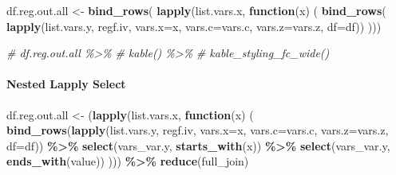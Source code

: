 \documentclass[
]{book}
\newenvironment{Shaded}{\begin{snugshade}}{\end{snugshade}}
\newcommand{\CommentTok}[1]{\textcolor[rgb]{0.56,0.35,0.01}{\textit{#1}}}
\newcommand{\ControlFlowTok}[1]{\textcolor[rgb]{0.13,0.29,0.53}{\textbf{#1}}}
\newcommand{\DataTypeTok}[1]{\textcolor[rgb]{0.13,0.29,0.53}{#1}}
\newcommand{\KeywordTok}[1]{\textcolor[rgb]{0.13,0.29,0.53}{\textbf{#1}}}
\newcommand{\NormalTok}[1]{#1}
\newcommand{\OperatorTok}[1]{\textcolor[rgb]{0.81,0.36,0.00}{\textbf{#1}}}
\newcommand{\StringTok}[1]{\textcolor[rgb]{0.31,0.60,0.02}{#1}}
\begin{document}
\begin{Shaded}
\begin{Highlighting}[]
\NormalTok{df.reg.out.all \textless{}{-}}\StringTok{ }\KeywordTok{bind\_rows}\NormalTok{(}
  \KeywordTok{lapply}\NormalTok{(list.vars.x,}
         \ControlFlowTok{function}\NormalTok{(x) (}
           \KeywordTok{bind\_rows}\NormalTok{(}
             \KeywordTok{lapply}\NormalTok{(list.vars.y, regf.iv,}
                    \DataTypeTok{vars.x=}\NormalTok{x, }\DataTypeTok{vars.c=}\NormalTok{vars.c, }\DataTypeTok{vars.z=}\NormalTok{vars.z, }\DataTypeTok{df=}\NormalTok{df))}
\NormalTok{         )))}
\end{Highlighting}
\end{Shaded}

\begin{Shaded}
\begin{Highlighting}[]
\CommentTok{\# df.reg.out.all \%\textgreater{}\%}
\CommentTok{\#   kable() \%\textgreater{}\%}
\CommentTok{\#   kable\_styling\_fc\_wide()}
\end{Highlighting}
\end{Shaded}

\hypertarget{nested-lapply-select}{%
\paragraph{Nested Lapply Select}\label{nested-lapply-select}}

\begin{Shaded}
\begin{Highlighting}[]
\NormalTok{df.reg.out.all \textless{}{-}}
\StringTok{  }\NormalTok{(}\KeywordTok{lapply}\NormalTok{(list.vars.x,}
          \ControlFlowTok{function}\NormalTok{(x) (}
            \KeywordTok{bind\_rows}\NormalTok{(}\KeywordTok{lapply}\NormalTok{(list.vars.y, regf.iv,}
                             \DataTypeTok{vars.x=}\NormalTok{x, }\DataTypeTok{vars.c=}\NormalTok{vars.c, }\DataTypeTok{vars.z=}\NormalTok{vars.z, }\DataTypeTok{df=}\NormalTok{df)) }\OperatorTok{\%\textgreater{}\%}
\StringTok{              }\KeywordTok{select}\NormalTok{(vars\_var.y, }\KeywordTok{starts\_with}\NormalTok{(x)) }\OperatorTok{\%\textgreater{}\%}
\StringTok{              }\KeywordTok{select}\NormalTok{(vars\_var.y, }\KeywordTok{ends\_with}\NormalTok{(}\StringTok{\textquotesingle{}value\textquotesingle{}}\NormalTok{))}
\NormalTok{          ))) }\OperatorTok{\%\textgreater{}\%}\StringTok{ }\KeywordTok{reduce}\NormalTok{(full\_join)}
\end{Highlighting}
\end{Shaded}
\end{document}

